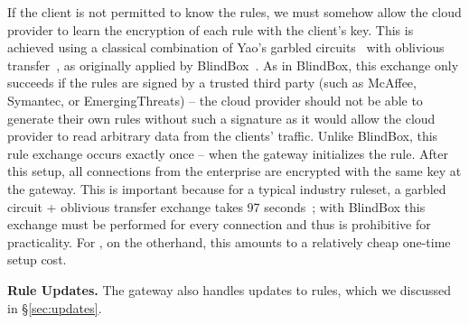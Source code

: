 If the client is not permitted to know the rules, we must somehow allow the cloud provider to learn the encryption of each rule with the client's key. This is achieved using a classical combination of Yao's garbled circuits~\cite{Yao86} with oblivious transfer~\cite{Naor-Pinkas}, as originally applied by BlindBox~\cite{blindbox}.
As in BlindBox, this exchange only succeeds if the rules are signed by a trusted third party (such as McAffee, Symantec, or EmergingThreats) -- the cloud provider should not be able to generate their own rules without such a signature as it would allow the cloud provider to read arbitrary data from the clients' traffic.
Unlike BlindBox, this rule exchange occurs exactly once -- when the gateway initializes the rule. 
After this setup, all connections from the enterprise are encrypted with the same key at the gateway.
This is important because for a typical industry ruleset, a garbled circuit + oblivious transfer exchange takes 97 seconds~\cite{blindbox}; with BlindBox this exchange must be performed for every connection and thus is prohibitive for practicality.
For \sys, on the otherhand, this amounts to a relatively cheap one-time setup cost.

\textbf{Rule Updates.}
The gateway also handles updates to rules, which we discussed in \S\ref{sec:updates}.


